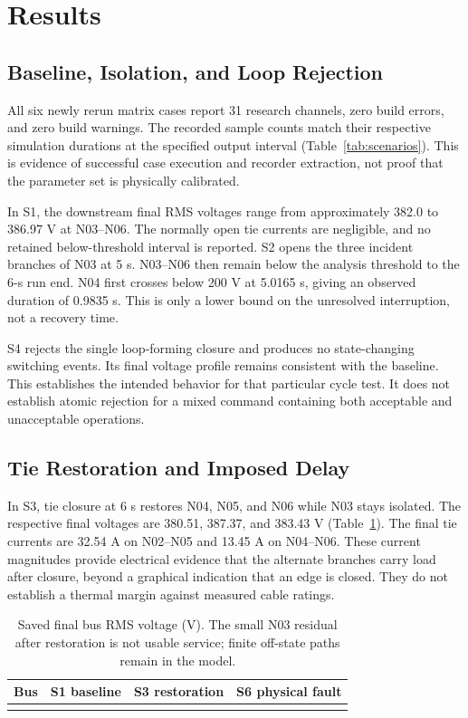 \section{Results}
\label{sec:results}
\subsection{Baseline, Isolation, and Loop Rejection}
All six newly rerun matrix cases report 31 research channels, zero build errors, and
zero build warnings. The recorded sample counts match their respective
simulation durations at the specified output interval
(Table~\ref{tab:scenarios}). This is evidence of successful case execution and
recorder extraction, not proof that the parameter set is physically calibrated.

In S1, the downstream final RMS voltages range from approximately 382.0 to
386.97 V at N03--N06. The normally open tie currents are negligible, and no
retained below-threshold interval is reported. S2 opens the three incident
branches of N03 at 5 s. N03--N06 then remain below the analysis threshold to
the 6-s run end. N04 first crosses below 200 V at 5.0165 s, giving an observed
duration of 0.9835 s. This is only a lower bound on the unresolved
interruption, not a recovery time.

S4 rejects the single loop-forming closure and produces no state-changing
switching events. Its final voltage profile remains consistent with the
baseline. This establishes the intended behavior for that particular cycle
test. It does not establish atomic rejection for a mixed command containing
both acceptable and unacceptable operations.

\subsection{Tie Restoration and Imposed Delay}
In S3, tie closure at 6 s restores N04, N05, and N06 while N03 stays isolated.
The respective final voltages are 380.51, 387.37, and 383.43 V
(Table~\ref{tab:voltages}). The final tie currents are 32.54 A on N02--N05
and 13.45 A on N04--N06. These current magnitudes provide electrical evidence
that the alternate branches carry load after closure, beyond a graphical
indication that an edge is closed. They do not establish a thermal margin
against measured cable ratings.

\begin{table}[tb]
\centering\small
\caption{Saved final bus RMS voltage (V). The small N03 residual after
restoration is not usable service; finite off-state paths remain in the model.}
\label{tab:voltages}
\begin{tabular}{@{}lrrr@{}}
\toprule
Bus & S1 baseline & S3 restoration & S6 physical fault \\
\midrule
\\
\bottomrule
\end{tabular}
\end{table}

